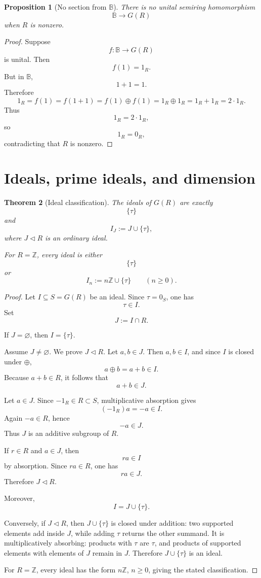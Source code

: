 \documentclass[11pt]{article}
\newtheorem{theorem}{Theorem}[section]
\newtheorem{proposition}[theorem]{Proposition}
\newcommand{\ZZ}{\mathbb Z}
\newcommand{\BB}{\mathbb B}
\begin{document}
\begin{proposition}[No section from \(\BB\)]
There is no unital semiring homomorphism
\[
\BB\to G(R)
\]
when \(R\) is nonzero.
\end{proposition}

\begin{proof}
Suppose
\[
f:\BB\to G(R)
\]
is unital. Then
\[
f(1)=1_R.
\]
But in \(\BB\),
\[
1+1=1.
\]
Therefore
\[
1_R=f(1)=f(1+1)=f(1)\oplus f(1)=1_R\oplus1_R=1_R+1_R=2\cdot1_R.
\]
Thus
\[
1_R=2\cdot1_R,
\]
so
\[
1_R=0_R,
\]
contradicting that \(R\) is nonzero.
\end{proof}

\section{Ideals, prime ideals, and dimension}

\begin{theorem}[Ideal classification]
The ideals of \(G(R)\) are exactly
\[
\{\tau\}
\]
and
\[
I_J:=J\cup\{\tau\},
\]
where \(J\triangleleft R\) is an ordinary ideal.

For \(R=\ZZ\), every ideal is either
\[
\{\tau\}
\]
or
\[
I_n:=n\ZZ\cup\{\tau\}
\qquad(n\ge0).
\]
\end{theorem}

\begin{proof}
Let \(I\subseteq S=G(R)\) be an ideal. Since \(\tau=0_S\), one has
\[
\tau\in I.
\]
Set
\[
J:=I\cap R.
\]

If \(J=\varnothing\), then \(I=\{\tau\}\).

Assume \(J\neq\varnothing\). We prove \(J\triangleleft R\). Let \(a,b\in J\). Then \(a,b\in I\), and since \(I\) is closed under \(\oplus\),
\[
a\oplus b=a+b\in I.
\]
Because \(a+b\in R\), it follows that
\[
a+b\in J.
\]

Let \(a\in J\). Since \(-1_R\in R\subset S\), multiplicative absorption gives
\[
(-1_R)a=-a\in I.
\]
Again \(-a\in R\), hence
\[
-a\in J.
\]
Thus \(J\) is an additive subgroup of \(R\).

If \(r\in R\) and \(a\in J\), then
\[
ra\in I
\]
by absorption. Since \(ra\in R\), one has
\[
ra\in J.
\]
Therefore \(J\triangleleft R\).

Moreover,
\[
I=J\cup\{\tau\}.
\]

Conversely, if \(J\triangleleft R\), then \(J\cup\{\tau\}\) is closed under addition:
two supported elements add inside \(J\), while adding \(\tau\) returns the other summand. It is multiplicatively absorbing: products with \(\tau\) are \(\tau\), and products of supported elements with elements of \(J\) remain in \(J\). Therefore \(J\cup\{\tau\}\) is an ideal.

For \(R=\ZZ\), every ideal has the form \(n\ZZ\), \(n\ge0\), giving the stated classification.
\end{proof}
\end{document}
